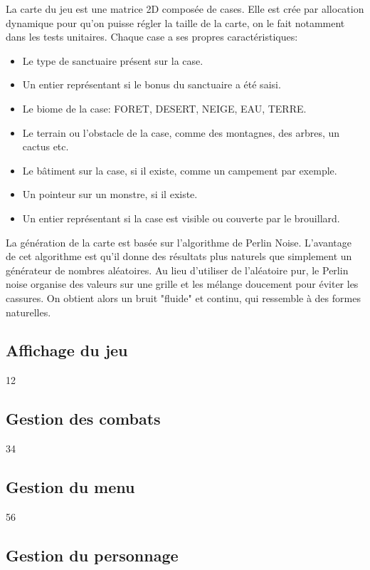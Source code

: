 \documentclass[11pt,a4paper]{article}
\begin{document}
La carte du jeu est une matrice 2D composée de cases.
Elle est crée par allocation dynamique pour qu'on puisse régler la taille de la carte, on le fait notamment dans les tests unitaires.
Chaque case a ses propres caractéristiques:

\begin{itemize}
\item Le type de sanctuaire présent sur la case.
\item Un entier représentant si le bonus du sanctuaire a été saisi.
\item Le biome de la case: FORET, DESERT, NEIGE, EAU, TERRE.
\item Le terrain ou l'obstacle de la case, comme des montagnes, des arbres, un cactus etc.
\item Le bâtiment sur la case, si il existe, comme un campement par exemple.
\item Un pointeur sur un monstre, si il existe.
\item Un entier représentant si la case est visible ou couverte par le brouillard.
\end{itemize}

La génération de la carte est basée sur l'algorithme de Perlin Noise.
L'avantage de cet algorithme est qu'il donne des résultats plus naturels que simplement un générateur de nombres aléatoires.
Au lieu d'utiliser de l'aléatoire pur, le Perlin noise organise des valeurs sur une grille et les mélange doucement pour éviter les cassures.
On obtient alors un bruit "fluide" et continu, qui ressemble à des formes naturelles.

\subsection{Affichage du jeu}

12

\subsection{Gestion des combats}

34

\subsection{Gestion du menu}

56

\subsection{Gestion du personnage}
\end{document}
